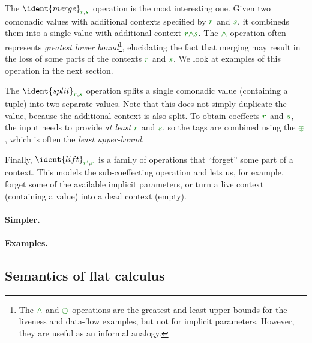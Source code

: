\noindent
The $\ident{merge}_{\cclrd{r},\cclrd{s}}$ operation is the most interesting one. Given two comonadic
values with additional contexts specified by $\cclrd{r}$ and $\cclrd{s}$, it combineds them into a 
single value with additional context $\cclrd{r}\czip\cclrd{s}$. The $\czip$ operation often represents
\emph{greatest lower bound}\footnote{The $\czip$ and $\cpar$ operations are the greatest and least upper 
bounds for the liveness and data-flow examples, but not for implicit parameters. However, they are useful 
as an informal analogy.}, elucidating the fact that merging may result in the loss of some parts of 
the contexts $\cclrd{r}$ and $\cclrd{s}$. We look at examples of this operation in the next section.

The $\ident{split}_{\cclrd{r},\cclrd{s}}$ operation splits a single comonadic value (containing a tuple)
into two separate values. Note that this does not simply duplicate the value, because the additional
context is also split. To obtain coeffects $\cclrd{r}$ and $\cclrd{s}$, the input needs to provide 
\emph{at least} $\cclrd{r}$ and $\cclrd{s}$, so the tags are combined using the $\cpar$, which is often 
the \emph{least upper-bound}\footnotemark[1].

Finally, $\ident{lift}_{\cclrd{r'}, \cclrd{r}}$ is a family of operations that ``forget'' some part of
a context. This models the sub-coeffecting operation and lets us, for example, forget some of the
available implicit parameters, or turn a live context (containing a value) into a dead context (empty).

\paragraph{Simpler.}

\paragraph{Examples.}

\subsection{Semantics of flat calculus}



\newcommand{\ccat}[0]{\mathcal{C}}
\newcommand{\cobind}[2]{#1^\dagger_{#2}}
\newcommand{\cmerge}[0]{ \ident{m} }
\newcommand{\csplit}[0]{ \ident{n} }
\newcommand{\counit}[0]{ \varepsilon }





